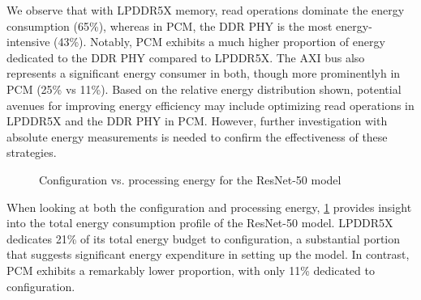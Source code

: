 

We observe that with LPDDR5X memory, read operations dominate the energy consumption (65\%), whereas in PCM, the DDR PHY is the most energy-intensive (43\%).
Notably, PCM exhibits a much higher proportion of energy dedicated to the DDR PHY compared to LPDDR5X.
The AXI bus also represents a significant energy consumer in both, though more prominentlyh in PCM (25\% vs 11\%).
Based on the relative energy distribution shown, potential avenues for improving energy efficiency may include optimizing read operations in LPDDR5X and the DDR PHY in PCM.
However, further investigation with absolute energy measurements is needed to confirm the effectiveness of these strategies.

\begin{figure}[hbtp]
    \centering
    \hfill
    \caption{Configuration vs. processing energy for the ResNet-50 model}
    \label{fig:resnet50_conf_proc}
\end{figure}

When looking at both the configuration and processing energy, \cref{fig:resnet50_conf_proc} provides insight into the total energy consumption profile of the ResNet-50 model.
LPDDR5X dedicates 21\% of its total energy budget to configuration, a substantial portion that suggests significant energy expenditure in setting up the model.
In contrast, PCM exhibits a remarkably lower proportion, with only 11\% dedicated to configuration.

